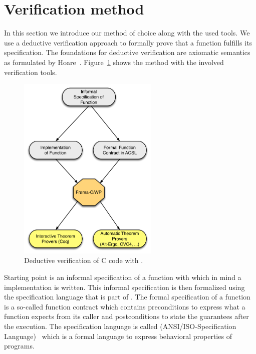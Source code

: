 \section{Verification method}
\label{sec:verification-method}
\label{method}

In this section we introduce our method of choice along with the used tools.
We use a deductive verification approach to 
formally prove that a function fulfills its specification.
The foundations for deductive verification are axiomatic semantics as formulated
by Hoare~\cite{HoareCalculus}.
Figure~\ref{fig:method} shows the method with the involved verification tools.

\begin{figure}[hbt]
\centering
\includegraphics[width=0.60\textwidth]{figures/deductive-verification.pdf}
\caption{\label{fig:method} Deductive verification of C code with \framacwp.}
\end{figure}

Starting point is an informal specification of a function with which in mind
a implementation is written.
This informal specification is then formalized using the
\acsl specification language that is part of \framac.
The formal specification of a function is a so-called function contract
which contains preconditions to express what a function expects from its caller
and postconditions to state the guarantees after the execution.
The specification language is called 
\acsl (ANSI\slash ISO-\isoc Specification Language)~\cite{acsl} 
which is a formal language to express behavioral properties of \isoc programs.

